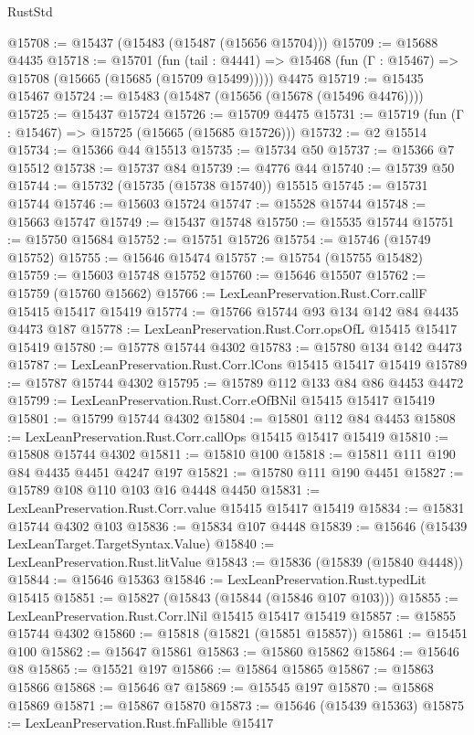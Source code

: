 \begin{lexlean}{RustStd}
\begin{coremodule}
@15708 := @15437 (@15483 (@15487 (@15656 @15704)))
@15709 := @15688 @4435
@15718 := @15701
    (fun (tail : @4441) => @15468 (fun (Γ : @15467) => @15708 (@15665 (@15685 (@15709 @15499)))))
    @4475
@15719 := @15435 @15467
@15724 := @15483 (@15487 (@15656 (@15678 (@15496 @4476))))
@15725 := @15437 @15724
@15726 := @15709 @4475
@15731 := @15719 (fun (Γ : @15467) => @15725 (@15665 (@15685 @15726)))
@15732 := @2 @15514
@15734 := @15366 @44 @15513
@15735 := @15734 @50
@15737 := @15366 @7 @15512
@15738 := @15737 @84
@15739 := @4776 @44
@15740 := @15739 @50
@15744 := @15732 (@15735 (@15738 @15740)) @15515
@15745 := @15731 @15744
@15746 := @15603 @15724
@15747 := @15528 @15744
@15748 := @15663 @15747
@15749 := @15437 @15748
@15750 := @15535 @15744
@15751 := @15750 @15684
@15752 := @15751 @15726
@15754 := @15746 (@15749 @15752)
@15755 := @15646 @15474
@15757 := @15754 (@15755 @15482)
@15759 := @15603 @15748 @15752
@15760 := @15646 @15507
@15762 := @15759 (@15760 @15662)
@15766 := LexLeanPreservation.Rust.Corr.callF @15415 @15417 @15419
@15774 := @15766 @15744 @93 @134 @142 @84 @4435 @4473 @187
@15778 := LexLeanPreservation.Rust.Corr.opsOfL @15415 @15417 @15419
@15780 := @15778 @15744 @4302
@15783 := @15780 @134 @142 @4473
@15787 := LexLeanPreservation.Rust.Corr.lCons @15415 @15417 @15419
@15789 := @15787 @15744 @4302
@15795 := @15789 @112 @133 @84 @86 @4453 @4472
@15799 := LexLeanPreservation.Rust.Corr.eOfBNil @15415 @15417 @15419
@15801 := @15799 @15744 @4302
@15804 := @15801 @112 @84 @4453
@15808 := LexLeanPreservation.Rust.Corr.callOps @15415 @15417 @15419
@15810 := @15808 @15744 @4302
@15811 := @15810 @100
@15818 := @15811 @111 @190 @84 @4435 @4451 @4247 @197
@15821 := @15780 @111 @190 @4451
@15827 := @15789 @108 @110 @103 @16 @4448 @4450
@15831 := LexLeanPreservation.Rust.Corr.value @15415 @15417 @15419
@15834 := @15831 @15744 @4302 @103
@15836 := @15834 @107 @4448
@15839 := @15646 (@15439 LexLeanTarget.TargetSyntax.Value)
@15840 := LexLeanPreservation.Rust.litValue
@15843 := @15836 (@15839 (@15840 @4448))
@15844 := @15646 @15363
@15846 := LexLeanPreservation.Rust.typedLit @15415
@15851 := @15827 (@15843 (@15844 (@15846 @107 @103)))
@15855 := LexLeanPreservation.Rust.Corr.lNil @15415 @15417 @15419
@15857 := @15855 @15744 @4302
@15860 := @15818 (@15821 (@15851 @15857))
@15861 := @15451 @100
@15862 := @15647 @15861
@15863 := @15860 @15862
@15864 := @15646 @8
@15865 := @15521 @197
@15866 := @15864 @15865
@15867 := @15863 @15866
@15868 := @15646 @7
@15869 := @15545 @197
@15870 := @15868 @15869
@15871 := @15867 @15870
@15873 := @15646 (@15439 @15363)
@15875 := LexLeanPreservation.Rust.fnFallible @15417

\end{coremodule}
\end{lexlean}
